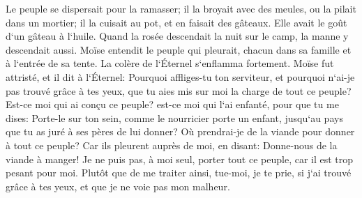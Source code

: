 \verse Le peuple se dispersait pour la ramasser; il la broyait avec des meules, ou la pilait dans un mortier; il la cuisait au pot, et en faisait des gâteaux. Elle avait le goût d`un gâteau à l`huile. 
\verse Quand la rosée descendait la nuit sur le camp, la manne y descendait aussi. 
\verse Moïse entendit le peuple qui pleurait, chacun dans sa famille et à l`entrée de sa tente. La colère de l`Éternel s`enflamma fortement. 
\verse Moïse fut attristé, et il dit à l`Éternel: Pourquoi affliges-tu ton serviteur, et pourquoi n`ai-je pas trouvé grâce à tes yeux, que tu aies mis sur moi la charge de tout ce peuple? 
\verse Est-ce moi qui ai conçu ce peuple? est-ce moi qui l`ai enfanté, pour que tu me dises: Porte-le sur ton sein, comme le nourricier porte un enfant, jusqu`au pays que tu as juré à ses pères de lui donner? 
\verse Où prendrai-je de la viande pour donner à tout ce peuple? Car ils pleurent auprès de moi, en disant: Donne-nous de la viande à manger! 
\verse Je ne puis pas, à moi seul, porter tout ce peuple, car il est trop pesant pour moi. 
\verse Plutôt que de me traiter ainsi, tue-moi, je te prie, si j`ai trouvé grâce à tes yeux, et que je ne voie pas mon malheur. 
